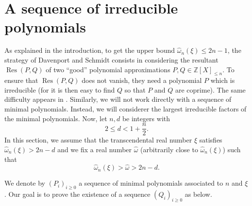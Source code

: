 \documentclass[JEP,XML,SOM,Unicode,NoFloatCountersInSection,published]{cedram}
\DeclareMathOperator\Res{Res}
\newcommand\bZ{\mathbb{Z}}
\newcommand\homega{\widehat{\omega}}\newcommand\HH{\mathcal{H}}
\theoremstyle{definition}
\theoremstyle{plain}
\begin{document}
\section{A sequence of irreducible polynomials}
\label{section: sequence des Q_i}

As explained in the introduction, to get the upper bound $\homega_n(\xi) \leq 2n-1$, the strategy of Davenport and Schmidt \cite{davenport1969approximation} consists in considering the resultant $\Res(P,Q)$ of two ``good'' polynomial approximations $P,Q\in \bZ[X]_{\leq n}$. To ensure that $\Res(P,Q)$ does not vanish, they need a polynomial $P$ which is irreducible (for it is then easy to find $Q$ so that $P$ and $Q$ are coprime). The same difficulty appears in \cite{bugeaudSchleischitz2016Uniform}. Similarly, we will not work directly with a sequence of minimal polynomials. Instead, we will considerer the largest irreducible factors of the minimal polynomials. Now, let $n,d$ be integers with
\[
2\leq d < 1+ \frac{n}{2}.
\]
In this section, we assume that the transcendental real number $\xi$ satisfies $\homega_n(\xi) > 2n -d$ and we fix a real number $\homega$ (arbitrarily close to $\homega_n(\xi)$) such that
\begin{equation}
\label{eq: notation homega}
\homega_n(\xi) > \homega > 2n -d.
\end{equation}

We denote by $(P_i)_{i\geq 0}$ a sequence of minimal polynomials associated to $n$ and $\xi$. Our goal is to prove the existence of a sequence $(Q_i)_{i\geq 0}$ as below.
\end{document}
